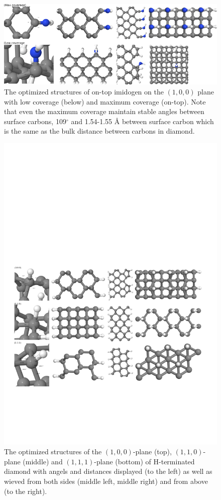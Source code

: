 \documentclass[10pt,a4paper]{article}
\begin{document}
\begin{figure} \captionsetup{width=.8\linewidth} \caption{The optimized structures of on-top imidogen on the $(1,  0,  0)$ plane with low coverage (below) and maximum coverage (on-top). Note that even the maximum coverage maintain stable angles between surface carbons, 109$^{\circ}$ and 1.54-1.55 Å between surface carbon which is the same as the bulk distance between carbons in diamond.} \label{NHdb_summary}
%
\includegraphics[width=.8\linewidth]{pictures/NHdb_summary.png}
\end{figure}



\begin{figure} \captionsetup{width=.8\linewidth} \caption{The optimized structures of the $(1,  0,  0)$-plane (top), $(1,  1,  0)$-plane (middle) and $(1,  1, 1)$-plane (bottom) of H-terminated diamond with angels and distances displayed (to the left) as well as wieved from both sides (middle left, middle right) and from above (to the right).} \label{H_terminated}
%
\includegraphics[width=.8\linewidth]{pictures/H_terminated2.png}
\end{figure}
\end{document}
